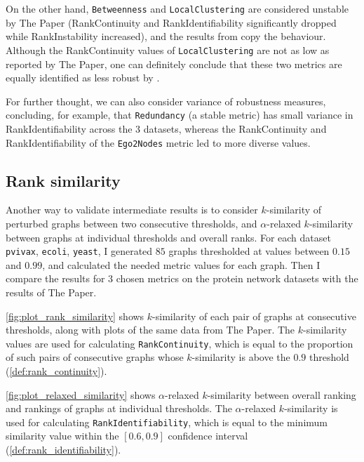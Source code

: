 On the other hand, \texttt{Betweenness} and \texttt{LocalClustering} are considered unstable by The Paper (RankContinuity and RankIdentifiability significantly dropped while RankInstability increased), and the results from \graffs copy the behaviour.
Although the RankContinuity values of \texttt{LocalClustering} are not as low as reported by The Paper, one can definitely conclude that these two metrics are equally identified as less robust by \graffs.

For further thought, we can also consider variance of robustness measures, concluding, for example, that \texttt{Redundancy} (a stable metric) has small variance in RankIdentifiability across the 3 datasets, whereas the RankContinuity and RankIdentifiability of the \texttt{Ego2Nodes} metric led to more diverse values.

\subsection{Rank similarity}

Another way to validate intermediate results is to consider $k$-similarity of perturbed graphs between two consecutive thresholds, and $\alpha$-relaxed $k$-similarity between graphs at individual thresholds and overall ranks.
For each dataset \texttt{pvivax}, \texttt{ecoli}, \texttt{yeast}, I generated $85$ graphs thresholded at values between $0.15$ and $0.99$, and calculated the needed metric values for each graph.
Then I compare the results for 3 chosen metrics on the protein network datasets with the results of The Paper.



\autoref{fig:plot_rank_similarity} shows $k$-similarity of each pair of graphs at consecutive thresholds, along with plots of the same data from The Paper.
The $k$-similarity values are used for calculating \texttt{RankContinuity}, which is equal to the proportion of such pairs of consecutive graphs whose $k$-similarity is above the $0.9$ threshold (\autoref{def:rank_continuity}).

\autoref{fig:plot_relaxed_similarity} shows $\alpha$-relaxed $k$-similarity between overall ranking and rankings of graphs at individual thresholds.
The $\alpha$-relaxed $k$-similarity is used for calculating \texttt{RankIdentifiability}, which is equal to the minimum similarity value within the $\left[ 0.6, 0.9 \right]$ confidence interval (\autoref{def:rank_identifiability}).

